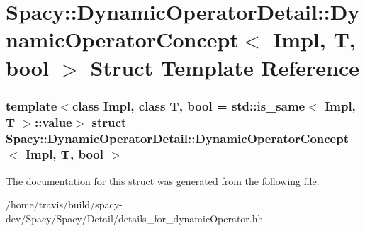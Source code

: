 \hypertarget{structSpacy_1_1DynamicOperatorDetail_1_1DynamicOperatorConcept}{\section{\-Spacy\-:\-:\-Dynamic\-Operator\-Detail\-:\-:\-Dynamic\-Operator\-Concept$<$ \-Impl, \-T, bool $>$ \-Struct \-Template \-Reference}
\label{structSpacy_1_1DynamicOperatorDetail_1_1DynamicOperatorConcept}
}
\subsubsection*{template$<$class Impl, class T, bool = std\-::is\-\_\-same$<$ Impl, T $>$\-::value$>$ struct Spacy\-::\-Dynamic\-Operator\-Detail\-::\-Dynamic\-Operator\-Concept$<$ Impl, T, bool $>$}



\-The documentation for this struct was generated from the following file\-:\begin{DoxyCompactItemize}
\item 
/home/travis/build/spacy-\/dev/\-Spacy/\-Spacy/\-Detail/details\-\_\-for\-\_\-dynamic\-Operator.\-hh\end{DoxyCompactItemize}
